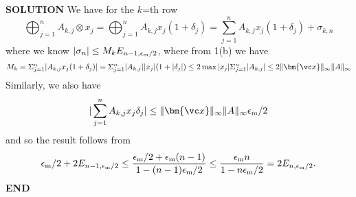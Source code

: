 \documentclass[12pt,a4paper]{article}
\def\x{ {\vc x} }
\begin{document}
\textbf{SOLUTION} We have for the $k$=th row
\[
\ensuremath{\bigoplus}_{j=1}^n A_{k,j} \ensuremath{\otimes} x_j =  \ensuremath{\bigoplus}_{j=1}^n A_{k,j} x_j (1+\ensuremath{\delta}_j) = 
\ensuremath{\sum}_{j=1}^n A_{k,j} x_j (1+\ensuremath{\delta}_j) + \ensuremath{\sigma}_{k,n}
\]
where we know $|\ensuremath{\sigma}_n| \ensuremath{\leq} M_k E_{n-1,\ensuremath{\epsilon}_{\rm m}/2}$, where from 1(b) we have
\[
M_k = \ensuremath{\Sigma}_{j=1}^n |A_{k,j}x_j (1+\ensuremath{\delta}_j)| = \ensuremath{\Sigma}_{j=1}^n |A_{k,j}| |x_j| (1+|\ensuremath{\delta}_j|)  \ensuremath{\leq} 2 \max |x_j| \ensuremath{\Sigma}_{j=1}^n |A_{k,j}|
\ensuremath{\leq} 2 \|\ensuremath{\bm{\x}}\|_\ensuremath{\infty} \|A \|_\ensuremath{\infty}
\]
Similarly, we also have 
\[
|\ensuremath{\sum}_{j=1}^n A_{k,j} x_j \ensuremath{\delta}_j| \ensuremath{\leq} \|\ensuremath{\bm{\x}}\|_\ensuremath{\infty} \|A \|_\ensuremath{\infty} \ensuremath{\epsilon}_{\rm m}/2
\]
and so the result follows from
\[
\ensuremath{\epsilon}_{\rm m}/2 + 2E_{n-1,\ensuremath{\epsilon}_{\rm m}/2} \ensuremath{\leq} {\ensuremath{\epsilon}_{\rm m}/2 + \ensuremath{\epsilon}_{\rm m} (n-1) \over 1-(n-1)\ensuremath{\epsilon}_{\rm m}/2} \ensuremath{\leq} {\ensuremath{\epsilon}_{\rm m} n \over 1-n\ensuremath{\epsilon}_{\rm m}/2} = 2E_{n,\ensuremath{\epsilon}_{\rm m}/2}.
\]
\textbf{END}
\end{document}
